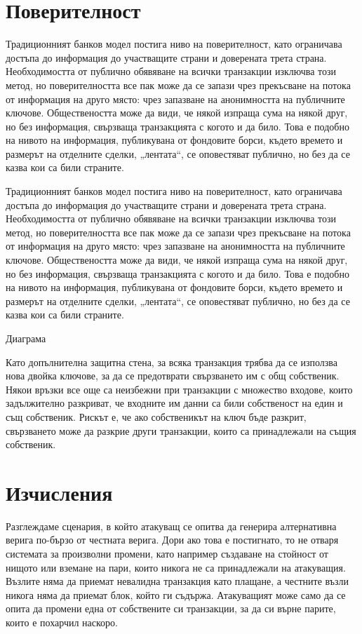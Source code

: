 \documentclass[11pt,a4paper]{article}
\begin{document}
\section{Поверителност}
Традиционният банков модел постига ниво на поверителност, като ограничава достъпа до информация до участващите страни и доверената трета страна. Необходимостта от публично обявяване на всички транзакции изключва този метод, но поверителността все пак може да се запази чрез прекъсване на потока от информация на друго място: чрез запазване на анонимността на публичните ключове. Обществеността може да види, че някой изпраща сума на някой друг, но без информация, свързваща транзакцията с когото и да било. Това е подобно на нивото на информация, публикувана от фондовите борси, където времето и размерът на отделните сделки, „лентата“, се оповестяват публично, но без да се казва кои са били страните.

Традиционният банков модел постига ниво на поверителност, като ограничава достъпа до информация до участващите страни и доверената трета страна. Необходимостта от публично обявяване на всички транзакции изключва този метод, но поверителността все пак може да се запази чрез прекъсване на потока от информация на друго място: чрез запазване на анонимността на публичните ключове. Обществеността може да види, че някой изпраща сума на някой друг, но без информация, свързваща транзакцията с когото и да било. Това е подобно на нивото на информация, публикувана от фондовите борси, където времето и размерът на отделните сделки, „лентата“, се оповестяват публично, но без да се казва кои са били страните.

Диаграма

Като допълнителна защитна стена, за всяка транзакция трябва да се използва нова двойка ключове, за да се предотврати свързването им с общ собственик. Някои връзки все още са неизбежни при транзакции с множество входове, които задължително разкриват, че входните им данни са били собственост на един и същ собственик. Рискът е, че ако собственикът на ключ бъде разкрит, свързването може да разкрие други транзакции, които са принадлежали на същия собственик.

\section{Изчисления}
Разглеждаме сценария, в който атакуващ се опитва да генерира алтернативна верига по-бързо от честната верига. Дори ако това е постигнато, то не отваря системата за произволни промени, като например създаване на стойност от нищото или вземане на пари, които никога не са принадлежали на атакуващия. Възлите няма да приемат невалидна транзакция като плащане, а честните възли никога няма да приемат блок, който ги съдържа. Атакуващият може само да се опита да промени една от собствените си транзакции, за да си върне парите, които е похарчил наскоро.
\end{document}
